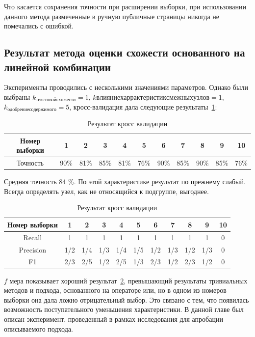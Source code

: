 \documentclass[annotation,times,page4]{itmo-student-thesis}
\begin{document}
Что касается сохранения точности при расширении выборки, при использовании данного метода размеченные в ручную публичные страницы никогда не помечались с ошибкой.

\subsection{Результат метода оценки схожести основанного на линейной комбинации}
Эксперименты проводились с несколькими значениями параметров. Однако были выбраны $k_{текстовой схожести} = 1$, $k{влияние харрактеристик смежных узлов}=1$, $k_{одобрение содержимого}=5$,  
кросс-валидация дала следующие результаты~\ref{tab1}:
\begin{table}[!h]
\caption{Результат кросс валидации}\label{tab1}
\centering
\begin{tabular}{|*{11}{c|}}\hline
Номер выборки & 1 & 2 & 3 & 4 & 5 & 6 & 7 & 8 & 9 & 10 \\\hline
Точность  & 90\% & 81\% & 85\% & 81\% & 76\% & 90\% & 85\% & 90\% & 85\% & 76\% \\\hline
\end{tabular}
\end{table}

Средняя точность 84 \%. По этой характеристике результат по прежнему слабый. Всегда определять узел, как не относящийся к подгруппе, выгоднее.

\begin{table}[!h]
\caption{Результат кросс валидации}\label{tab4}
\centering
\begin{tabular}{|*{11}{c|}}\hline
Номер выборки & 1 & 2 & 3 & 4 & 5 & 6 & 7 & 8 & 9 & 10 \\\hline
Recall  & 1& 1& 1& 1& 1& 1& 1& 1& 1& 0\\\hline
Precision & 1/2 & 1/4 & 1/3 & 1/4 & 1/5 & 1/2 & 1/3 & 1/2 & 1/3 & 0\\\hline
F1        & 2/3 & 2/5 & 1/2 & 2/5 & 1/3 & 2/3 & 1/2 & 2/3 & 1/2 & 0 \\\hline

\end{tabular}
\end{table}

$f$ мера показывает хороший результат~\ref{tab4}, превышающий результаты тривиальных методов и подхода, основанного на операторе или, но в одном из номеров выборки она дала ложно отрицательный выбор. Это связано с тем, что появилась возможность поступательного уменьшения характеристики.
\chapterconclusion
В данной главе был описан эксперимент, проведенный в рамках исследования для апробации описываемого подхода.
\end{document}
